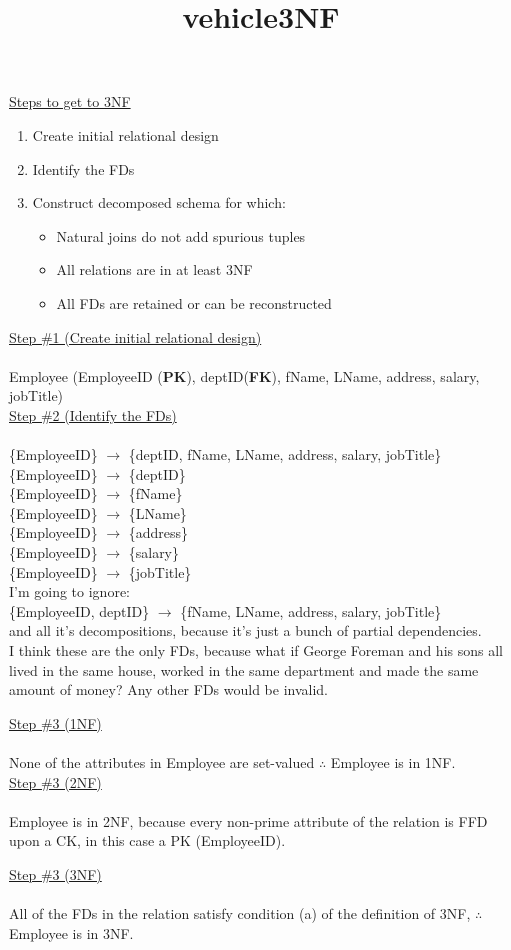 \documentclass[12pt]{article}   %
\title{vehicle3NF}
\begin{document}
\underline{Steps to get to 3NF}
\begin{enumerate}
    \item Create initial relational design
    \item Identify the FDs
    \item Construct decomposed schema for which:
          \begin{itemize}
              \item Natural joins do not add spurious tuples
              \item All relations are in at least 3NF
              \item All FDs are retained or can be reconstructed
          \end{itemize}
\end{enumerate}

\underline{Step \#1 (Create initial relational design)}\\
\\
Employee (EmployeeID (\textbf{PK}), deptID(\textbf{FK}), fName, LName, address, salary, jobTitle)\\

\underline{Step \#2 (Identify the FDs)}\\
\\
\{EmployeeID\} $\longrightarrow$ \{deptID, fName, LName, address, salary, jobTitle\}\\
\{EmployeeID\} $\longrightarrow$ \{deptID\}\\
\{EmployeeID\} $\longrightarrow$ \{fName\}\\
\{EmployeeID\} $\longrightarrow$ \{LName\}\\
\{EmployeeID\} $\longrightarrow$ \{address\}\\
\{EmployeeID\} $\longrightarrow$ \{salary\}\\
\{EmployeeID\} $\longrightarrow$ \{jobTitle\}\\

I'm going to ignore:\\
\{EmployeeID, deptID\} $\longrightarrow$ \{fName, LName, address, salary, jobTitle\}\\
and all it's decompositions, because it's just a bunch of partial dependencies.\\

I think these are the only FDs, because what if George Foreman and his sons all lived in the same house, worked in the same department and made the same amount of money? Any other FDs would be invalid. 


\underline{Step \#3 (1NF)}\\
\\
None of the attributes in Employee are set-valued $\therefore$ Employee is in 1NF.\\

\underline{Step \#3 (2NF)}\\
\\
Employee is in 2NF, because every non-prime attribute of the relation is FFD upon a CK, in this case a PK (EmployeeID).

\underline{Step \#3 (3NF)}\\
\\
All of the FDs in the relation satisfy condition (a) of the definition of 3NF, $\therefore$ Employee is in 3NF.
\end{document}
